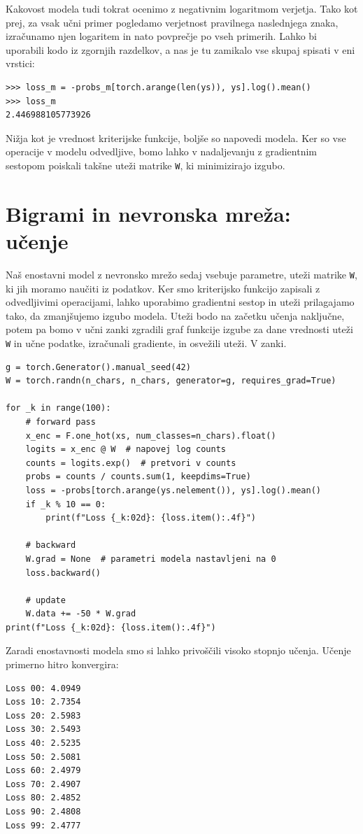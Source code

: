 Kakovost modela tudi tokrat ocenimo z negativnim logaritmom verjetja. Tako kot prej, za vsak učni primer pogledamo verjetnost pravilnega naslednjega znaka, izračunamo njen logaritem in nato povprečje po vseh primerih. Lahko bi uporabili kodo iz zgornjih razdelkov, a nas je tu zamikalo vse skupaj spisati v eni vrstici:
%
\vspace*{3mm}
\begin{lstlisting}
>>> loss_m = -probs_m[torch.arange(len(ys)), ys].log().mean()
>>> loss_m
2.446988105773926
\end{lstlisting}

Nižja kot je vrednost kriterijske funkcije, boljše so napovedi modela. Ker so vse operacije v modelu odvedljive, bomo lahko v nadaljevanju z gradientnim sestopom poiskali takšne uteži matrike \texttt{W}, ki minimizirajo izgubo.

\section{Bigrami in nevronska mreža: učenje}

Naš enostavni model z nevronsko mrežo sedaj vsebuje parametre, uteži matrike \texttt{W}, ki jih moramo naučiti iz podatkov. Ker smo kriterijsko funkcijo zapisali z odvedljivimi operacijami, lahko uporabimo gradientni sestop in uteži prilagajamo tako, da zmanjšujemo izgubo modela. Uteži bodo na začetku učenja naključne, potem pa bomo v učni zanki zgradili graf funkcije izgube za dane vrednosti uteži \texttt{W} in učne podatke, izračunali gradiente, in osvežili uteži. V zanki. 
%
\vspace*{3mm}
\begin{lstlisting}
g = torch.Generator().manual_seed(42)
W = torch.randn(n_chars, n_chars, generator=g, requires_grad=True)

for _k in range(100):
    # forward pass
    x_enc = F.one_hot(xs, num_classes=n_chars).float()
    logits = x_enc @ W  # napovej log counts
    counts = logits.exp()  # pretvori v counts
    probs = counts / counts.sum(1, keepdims=True)
    loss = -probs[torch.arange(ys.nelement()), ys].log().mean()
    if _k % 10 == 0:
        print(f"Loss {_k:02d}: {loss.item():.4f}")

    # backward
    W.grad = None  # parametri modela nastavljeni na 0
    loss.backward()

    # update
    W.data += -50 * W.grad
print(f"Loss {_k:02d}: {loss.item():.4f}")
\end{lstlisting}
%
Zaradi enostavnosti modela smo si lahko privoščili visoko stopnjo učenja. Učenje primerno hitro konvergira:
\vspace*{3mm}
\begin{lstlisting}
Loss 00: 4.0949
Loss 10: 2.7354
Loss 20: 2.5983
Loss 30: 2.5493
Loss 40: 2.5235
Loss 50: 2.5081
Loss 60: 2.4979
Loss 70: 2.4907
Loss 80: 2.4852
Loss 90: 2.4808
Loss 99: 2.4777
\end{lstlisting}

